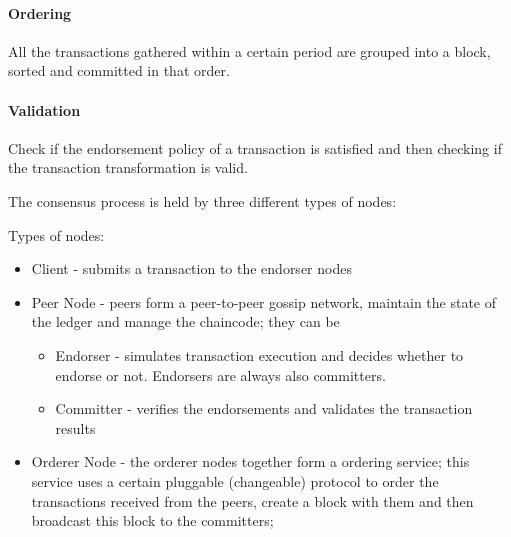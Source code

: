 \paragraph{Ordering} All the transactions gathered within a certain period are grouped into a block, sorted and committed in that order.

\paragraph{Validation} Check if the endorsement policy of a transaction is satisfied and then checking if the transaction transformation is valid.

The consensus process is held by three different types of nodes:

Types of nodes:
\begin{itemize}
\item Client - submits a transaction to the endorser nodes
\item Peer Node - peers form a peer-to-peer gossip network, maintain the state of the ledger and manage the chaincode; they can be 
	\begin{itemize}
    \item Endorser - simulates transaction execution and decides whether to endorse or not. Endorsers are always also committers.
    \item Committer - verifies the endorsements and validates the transaction results 
    \end{itemize}
\item Orderer Node - the orderer nodes together form a ordering service; this service uses a certain pluggable (changeable) protocol to order the transactions received from the peers, create a block with them and then broadcast this block to the committers;
\end{itemize}


